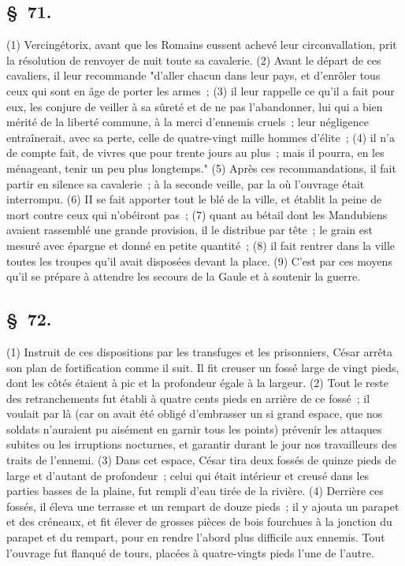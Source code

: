\documentclass[french,twoside]{book} %
\begin{document}
\subsection[{§ 71.}]{ \textsc{§ 71.} }
\noindent (1) Vercingétorix, avant que les Romains eussent achevé leur circonvallation, prit la résolution de renvoyer de nuit toute sa cavalerie. (2) Avant le départ de ces cavaliers, il leur recommande "d’aller chacun dans leur pays, et d’enrôler tous ceux qui sont en âge de porter les armes ; (3) il leur rappelle ce qu’il a fait pour eux, les conjure de veiller à sa sûreté et de ne pas l’abandonner, lui qui a bien mérité de la liberté commune, à la merci d’ennemis cruels ; leur négligence entraînerait, avec sa perte, celle de quatre-vingt mille hommes d’élite ; (4) il n’a de compte fait, de vivres que pour trente jours au plus ; mais il pourra, en les ménageant, tenir un peu plus longtemps." (5) Après ces recommandations, il fait partir en silence sa cavalerie ; à la seconde veille, par la où l’ouvrage était interrompu. (6) II se fait apporter tout le blé de la ville, et établit la peine de mort contre ceux qui n’obéiront pas ; (7) quant au bétail dont les Mandubiens avaient rassemblé une grande provision, il le distribue par tête ; le grain est mesuré avec épargne et donné en petite quantité ; (8) il fait rentrer dans la ville toutes les troupes qu’il avait disposées devant la place. (9) C'est par ces moyens qu’il se prépare à attendre les secours de la Gaule et à soutenir la guerre.
\subsection[{§ 72.}]{ \textsc{§ 72.} }
\noindent (1) Instruit de ces dispositions par les transfuges et les prisonniers, César arrêta son plan de fortification comme il suit. Il fit creuser un fossé large de vingt pieds, dont les côtés étaient à pic et la profondeur égale à la largeur. (2) Tout le reste des retranchements fut établi à quatre cents pieds en arrière de ce fossé ; il voulait par là (car on avait été obligé d’embrasser un si grand espace, que nos soldats n’auraient pu aisément en garnir tous les points) prévenir les attaques subites ou les irruptions nocturnes, et garantir durant le jour nos travailleurs des traits de l’ennemi. (3) Dans cet espace, César tira deux fossés de quinze pieds de large et d’autant de profondeur ; celui qui était intérieur et creusé dans les parties basses de la plaine, fut rempli d’eau tirée de la rivière. (4) Derrière ces fossés, il éleva une terrasse et un rempart de douze pieds ; il y ajouta un parapet et des créneaux, et fit élever de grosses pièces de bois fourchues à la jonction du parapet et du rempart, pour en rendre l’abord plus difficile aux ennemis. Tout l’ouvrage fut flanqué de tours, placées à quatre-vingts pieds l’une de l’autre.
\end{document}
